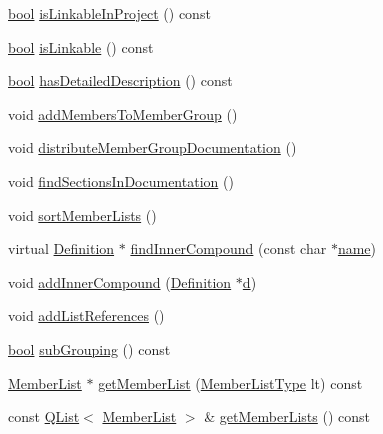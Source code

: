 \begin{DoxyCompactItemize}
\item 
\hyperlink{qglobal_8h_a1062901a7428fdd9c7f180f5e01ea056}{bool} \hyperlink{class_namespace_def_abdc3193c30d63172fd72c9ab38d22312}{is\+Linkable\+In\+Project} () const 
\item 
\hyperlink{qglobal_8h_a1062901a7428fdd9c7f180f5e01ea056}{bool} \hyperlink{class_namespace_def_a5bbc047ff9799f2f74668168afacc0b2}{is\+Linkable} () const 
\item 
\hyperlink{qglobal_8h_a1062901a7428fdd9c7f180f5e01ea056}{bool} \hyperlink{class_namespace_def_a7597de5f4fdc26c0f56d58648019d75f}{has\+Detailed\+Description} () const 
\item 
void \hyperlink{class_namespace_def_a7843352a55567c1ccb4b96a86bcf54e2}{add\+Members\+To\+Member\+Group} ()
\item 
void \hyperlink{class_namespace_def_a94df90e63dbf4b65d7b1be2972bb7f03}{distribute\+Member\+Group\+Documentation} ()
\item 
void \hyperlink{class_namespace_def_abdbe6e3d3e00c6b20c50cc9a5a0447de}{find\+Sections\+In\+Documentation} ()
\item 
void \hyperlink{class_namespace_def_a7ad2c40126a71d97ca73f5709c4fcdaa}{sort\+Member\+Lists} ()
\item 
virtual \hyperlink{class_definition}{Definition} $\ast$ \hyperlink{class_namespace_def_ab1e09c18d190190ed0b7b146eb4ab294}{find\+Inner\+Compound} (const char $\ast$\hyperlink{class_definition_a99481361779e85f0c1556709de7d9e5b}{name})
\item 
void \hyperlink{class_namespace_def_ab431efd27db6de103556a8def3478c3c}{add\+Inner\+Compound} (\hyperlink{class_definition}{Definition} $\ast$\hyperlink{060__command__switch_8tcl_af43f4b1f0064a33b2d662af9f06d3a00}{d})
\item 
void \hyperlink{class_namespace_def_acc3c42d51f100c04730288dd00bb0d24}{add\+List\+References} ()
\item 
\hyperlink{qglobal_8h_a1062901a7428fdd9c7f180f5e01ea056}{bool} \hyperlink{class_namespace_def_a90ec3b3c76198f7b2b0338656080aaa2}{sub\+Grouping} () const 
\item 
\hyperlink{class_member_list}{Member\+List} $\ast$ \hyperlink{class_namespace_def_a269d7340cbe7f3c11b16192146c4a9c6}{get\+Member\+List} (\hyperlink{types_8h_abe8ad5992f8938a28f918f51b199aa19}{Member\+List\+Type} lt) const 
\item 
const \hyperlink{class_q_list}{Q\+List}$<$ \hyperlink{class_member_list}{Member\+List} $>$ \& \hyperlink{class_namespace_def_a89eeb4ff1047ac5a379514c558666f73}{get\+Member\+Lists} () const 

\end{DoxyCompactItemize}
